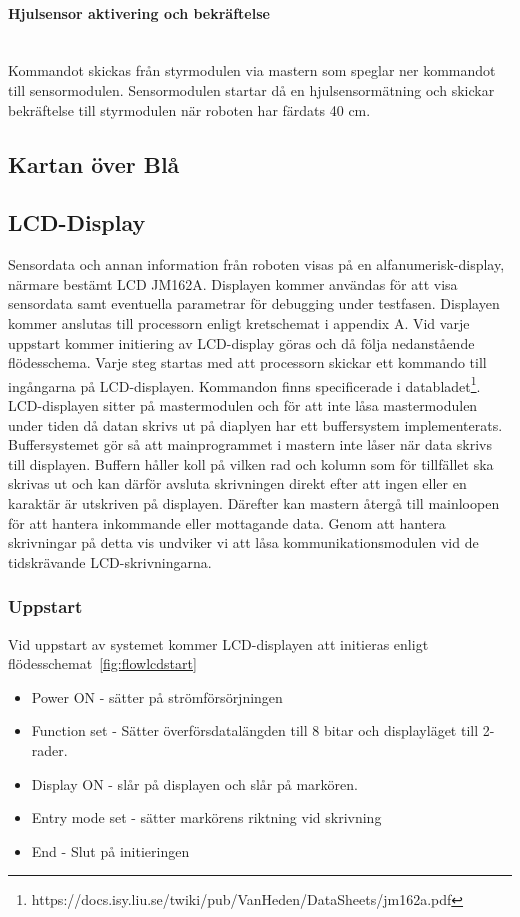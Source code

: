 \documentclass[a4paper,12pt,fleqn]{article}
\begin{document}
\paragraph{Hjulsensor aktivering och bekräftelse}
~\\
Kommandot skickas från styrmodulen via mastern som speglar ner kommandot till sensormodulen. Sensormodulen startar då en hjulsensormätning och skickar bekräftelse till styrmodulen när roboten har färdats 40 cm. 

\subsection{Kartan över Blå}

\subsection{LCD-Display}
Sensordata och annan information från roboten visas på en alfanumerisk-display, närmare bestämt  LCD JM162A. Displayen kommer användas för att visa sensordata samt eventuella parametrar för debugging under testfasen.
Displayen kommer anslutas till processorn enligt kretschemat i appendix A. 
Vid varje uppstart kommer initiering av LCD-display göras och då följa nedanstående flödesschema. Varje steg startas med att processorn skickar ett kommando till ingångarna på LCD-displayen. Kommandon finns specificerade i databladet\footnote{https://docs.isy.liu.se/twiki/pub/VanHeden/DataSheets/jm162a.pdf}. LCD-displayen sitter på mastermodulen och för att inte låsa mastermodulen under tiden då datan skrivs ut på diaplyen har ett buffersystem implementerats. Buffersystemet gör så att mainprogrammet i mastern inte låser när data skrivs till displayen. Buffern håller koll på vilken rad och kolumn som för tillfället ska skrivas ut och kan därför avsluta skrivningen direkt efter att ingen eller en karaktär är utskriven på displayen. Därefter kan mastern återgå till mainloopen för att hantera inkommande eller mottagande data. Genom att hantera skrivningar på detta vis undviker vi att låsa kommunikationsmodulen vid de tidskrävande LCD-skrivningarna.

\subsubsection{Uppstart}
	
Vid uppstart av systemet kommer LCD-displayen att initieras enligt flödes\-schemat~\ref{fig:flowlcdstart}

\begin{itemize}
  \item Power ON - sätter på strömförsörjningen
  \item Function set - Sätter överförsdatalängden till 8 bitar och displayläget till 2-rader.
  \item Display ON - slår på displayen och slår på markören. 
  \item Entry mode set - sätter markörens riktning vid skrivning
  \item End - Slut på initieringen
\end{itemize}
\end{document}

